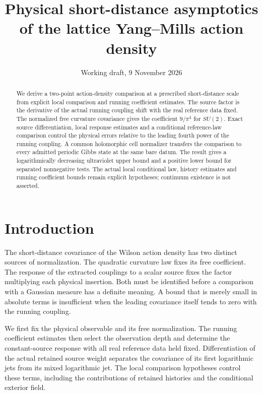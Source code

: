 \documentclass[11pt,letterpaper,reqno]{amsart}
\title[Physical short-distance asymptotics]{Physical short-distance asymptotics of the lattice Yang--Mills action density}
\date{Working draft, 9 November 2026}
\numberwithin{equation}{section}
\theoremstyle{definition}
\theoremstyle{remark}
\begin{document}
\raggedbottom
\begin{abstract}
We derive a two-point action-density comparison at a prescribed
short-distance scale from explicit local comparison and running
coefficient estimates. The source factor is the derivative of the
actual running coupling shift with the real reference data fixed.
The normalized free curvature covariance gives the coefficient
\(9/\pi^4\) for \(SU(2)\). Exact source differentiation, local
response estimates and a conditional reference-law comparison
control the physical errors relative to the leading fourth power
of the running coupling. A common holomorphic cell normalizer
transfers the comparison to every admitted periodic Gibbs state
at the same bare datum. The result gives a logarithmically
decreasing ultraviolet upper bound and a positive lower bound
for separated nonnegative tests. The actual local conditional
law, history estimates and running coefficient bounds remain
explicit hypotheses; continuum existence is not asserted.
\end{abstract}
\maketitle
\tableofcontents

\section{Introduction}

The short-distance covariance of the Wilson action density has
two distinct sources of normalization. The quadratic curvature
law fixes its free coefficient. The response of the extracted
couplings to a scalar source fixes the factor multiplying each
physical insertion. Both must be identified before a comparison
with a Gaussian measure has a definite meaning. A bound that is
merely small in absolute terms is insufficient when the leading
covariance itself tends to zero with the running coupling.

We first fix the physical observable and its free normalization.
The running coefficient estimates then select the observation
depth and determine the constant-source response with all real
reference data held fixed. Differentiation of the actual retained
source weight separates the covariance of its first logarithmic
jets from its mixed logarithmic jet. The local comparison hypotheses control
these terms, including the contributions of retained histories
and the conditional exterior field.
\end{document}
